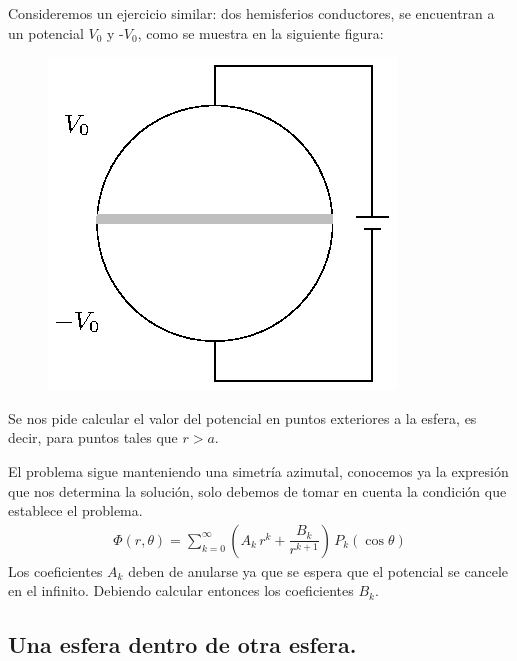 Consideremos un ejercicio similar: dos hemisferios conductores, se encuentran a un potencial $V_{0}$ y -$V_{0}$, como se muestra en la siguiente figura:
\begin{figure}[H]
    \centering
    \includegraphics[scale=1.3]{Imagenes/Ejemplo_Esfera_03.eps}
\end{figure}

Se nos pide calcular el valor del potencial en puntos exteriores a la esfera, es decir, para puntos tales que $r > a$.
\par
El problema sigue manteniendo una simetría azimutal, conocemos ya la expresión que nos determina la solución, solo debemos de tomar en cuenta la condición que establece el problema.
\begin{align*}
\Phi (r, \theta) = \sum_{k=0}^{\infty} \left( A_{k} \, r^{k} + \dfrac{B_{k}}{r^{k+1}} \right) \, P_{k} (\cos \theta)
\end{align*}
Los coeficientes $A_{k}$ deben de anularse ya que se espera que el potencial se cancele en el infinito. Debiendo calcular entonces los coeficientes $B_{k}$.

\subsection{Una esfera dentro de otra esfera.}

